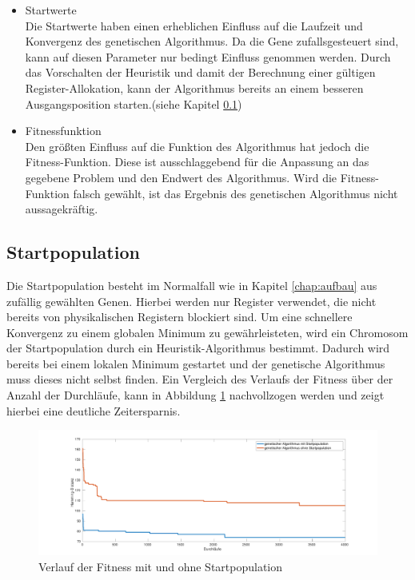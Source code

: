 \begin{itemize}
	\item Startwerte\\
		Die Startwerte haben einen erheblichen Einfluss auf die Laufzeit und Konvergenz des genetischen Algorithmus. Da die Gene zufallsgesteuert sind, kann auf diesen Parameter nur bedingt Einfluss genommen werden. Durch das Vorschalten der Heuristik und damit der Berechnung einer gültigen Register-Allokation, kann der Algorithmus bereits an einem besseren Ausgangsposition starten.(siehe Kapitel \ref{sub:startpop})
	\item Fitnessfunktion\\
		Den größten Einfluss auf die Funktion des Algorithmus hat jedoch die Fitness-Funktion. Diese ist ausschlaggebend für die Anpassung an das gegebene Problem und den Endwert des Algorithmus. Wird die Fitness-Funktion falsch gewählt, ist das Ergebnis des genetischen Algorithmus nicht aussagekräftig. 
\end{itemize}
 
\subsection{Startpopulation}
\label{sub:startpop}
Die Startpopulation besteht im Normalfall wie in Kapitel \ref{chap:aufbau} aus zufällig gewählten Genen. Hierbei werden nur Register verwendet, die nicht bereits von physikalischen Registern blockiert sind.
Um eine schnellere Konvergenz zu einem globalen Minimum zu gewährleisteten, wird ein Chromosom der Startpopulation durch ein Heuristik-Algorithmus bestimmt. Dadurch wird bereits bei einem lokalen Minimum gestartet und der genetische Algorithmus muss dieses nicht selbst finden. Ein Vergleich des Verlaufs der Fitness über der Anzahl der Durchläufe, kann in Abbildung \ref{fig:startpop} nachvollzogen werden und zeigt hierbei eine deutliche Zeitersparnis.

\begin{figure}[H]
	\centering
	\includegraphics[width=\textwidth]{fig/startpop.pdf}
	\caption{Verlauf der Fitness mit und ohne Startpopulation}
	\label{fig:startpop}
\end{figure}

